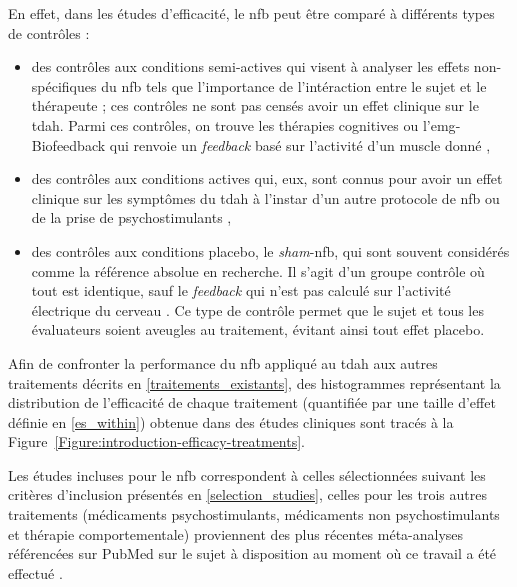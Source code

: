 En effet, dans les études d'efficacité, le \gls{nfb} peut être comparé à différents types de contrôles \citep{Arns2014} :
\begin{itemize}
\item des contrôles aux conditions semi-actives qui visent à analyser les effets non-spécifiques du \gls{nfb} tels que l'importance de l'intéraction entre le sujet et le thérapeute ; 
ces contrôles ne sont pas censés avoir un effet clinique sur le \gls{tdah}. Parmi ces contrôles, on trouve les thérapies cognitives ou l'\gls{emg}-Biofeedback qui renvoie un \textit{feedback} basé
sur l'activité d'un muscle donné \citep{Bakhshayesh2011},
\item des contrôles aux conditions actives qui, eux, sont connus pour avoir un effet clinique sur les symptômes du \gls{tdah} à l'instar d'un autre protocole de \gls{nfb} \citep{Leins2007} ou
de la prise de psychostimulants \citep{Meisel2014},
\item des contrôles aux conditions placebo, le \textit{sham}-\gls{nfb}, qui sont souvent considérés comme la référence absolue en recherche. Il s'agit d'un groupe contrôle
où tout est identique, sauf le \textit{feedback} qui n'est pas calculé sur l'activité électrique du cerveau \citep{Arnold2013}. Ce type de contrôle permet 
que le sujet et tous les évaluateurs soient aveugles au traitement, évitant ainsi tout effet placebo.
\end{itemize}

Afin de confronter la performance du \gls{nfb} appliqué au \gls{tdah} aux autres traitements décrits en \ref{traitements_existants}, des histogrammes
représentant la distribution de l'efficacité de chaque traitement (quantifiée par une taille d'effet définie en \ref{es_within}) obtenue dans des études cliniques
sont tracés à la Figure~\ref{Figure:introduction-efficacy-treatments}.

Les études incluses pour le \gls{nfb} correspondent à celles sélectionnées suivant les critères d'inclusion présentés en \ref{selection_studies}, celles pour les
trois autres traitements (médicaments psychostimulants, médicaments non psychostimulants et thérapie comportementale) proviennent des plus récentes méta-analyses 
référencées sur PubMed sur le sujet à disposition au moment où ce travail a été effectué \citep{Luan2017, Catala2017}.

